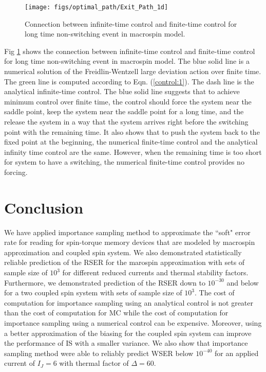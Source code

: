 \documentclass[journal,transmag]{IEEEtran}
\begin{document}
 \begin{figure}[h]
   \centering
         \texttt{[image: figs/optimal\_path/Exit\_Path\_1d]}
   \caption{Connection between infinite-time control and finite-time control for long time non-switching event in macrospin model.}
   \label{fig:Non_switching_path_1d}
\end{figure}
Fig \ref{fig:Non_switching_path_1d} shows the connection between infinite-time control and finite-time control for long time non-switching event in macrospin model. The blue solid line is a numerical solution of the Freidlin-Wentzell large deviation action over finite time. The green line is computed according to Eqn. (\ref{control:1}). The dash line is the analytical infinite-time control. The blue solid line suggests that to achieve minimum control over finite time, the control should force the system near the saddle point, keep the system near the saddle point for a long time, and the release the system in a way that the system arrives right before the switching point with the remaining time. It also shows that to push the system back to the fixed point at the beginning, the numerical finite-time control and the analytical infinity time control are the same. However, when the remaining time is too short for system to have a switching, the numerical finite-time control provides no forcing.
 \section{Conclusion}
We have applied importance sampling method to approximate the ``soft" error rate for reading for spin-torque memory devices that are modeled by macrospin approximation and coupled spin system. We also demonstrated statistically reliable prediction of the RSER for the marospin approximation with sets of sample size of $10^3$ for different reduced currents and thermal stability factors. Furthermore,  we  demonstrated prediction of the RSER down to $10^{-30}$ and below for a two coupled spin system with sets of sample size of $10^3$.   The cost of computation for importance sampling using an analytical control is not greater than the cost of computation for MC while the cost of computation for importance sampling using a numerical control can be expensive.  Moreover, using a better approximation of the biasing for the coupled spin system can improve the performance of IS with a smaller variance. We also show that importance sampling method were able to reliably predict WSER below $10^{-40}$ for an applied current of $I_J = 6$ with thermal factor of $\Delta = 60$.
\end{document}
